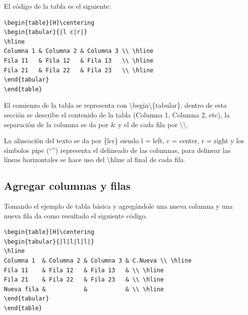 \documentclass[letterpaper, 10pt, journal]{IEEEtran}
\begin{document}
El c\'{o}digo de la tabla es el siguiente:

\lstset{language=Java}
\begin{lstlisting}
\begin{table}[H]\centering
\begin{tabular}{|l c|r|}
\hline
Columna 1 & Columna 2 & Columna 3 \\ \hline
Fila 11   & Fila 12   & Fila 13   \\ \hline
Fila 21   & Fila 22   & Fila 23   \\ \hline
\end{tabular}
\end{table}
\end{lstlisting}

El comienzo de la tabla se representa con \textbackslash begin\textbackslash\{tabular\}, dentro de esta secci\'{o}n se describe el contenido de la tabla (Columna 1, Columna 2, etc), la separaci\'{o}n de la columna se da por \& y el de cada fila por \textbackslash\textbackslash. 

La alineaci\'on del texto se da por \{\textbar l\textbar c\textbar r\textbar\} siendo l = left, c = center, r = right y los s\'{\i}mbolos pipe (\textquotedblleft{}\textbar{}\textquotedblright{}) representa el delineado de las columnas, para delinear las l\'ineas horizontales se hace uso del \textbackslash{}hline al final de cada fila.

\subsection{Agregar columnas y filas}

Tomando el ejemplo de tabla b\'asica y agreg\'andole una nueva columna y una nueva fila da como resultado el siguiente c\'odigo.

\lstset{language=Java}
\begin{lstlisting}
\begin{table}[H]\centering
\begin{tabular}{|l|l|l|l|}
\hline
Columna 1  & Columna 2 & Columna 3 & C.Nueva \\ \hline
Fila 11    & Fila 12   & Fila 13   & \\ \hline
Fila 21    & Fila 22   & Fila 23   & \\ \hline
Nueva fila &           &           & \\ \hline
\end{tabular}
\end{table}
\end{lstlisting}
\end{document}
